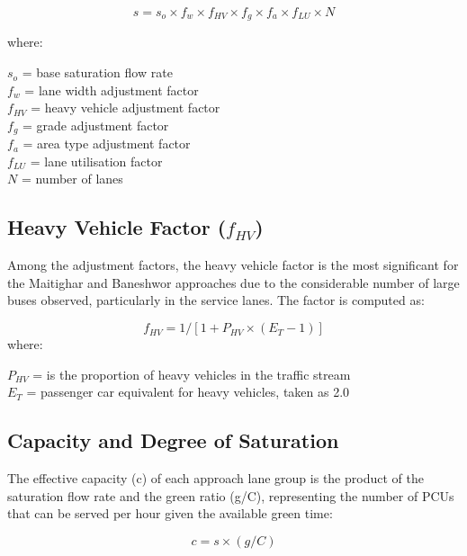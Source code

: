 \begin{equation}
    s = s_o \times f_w \times f_{HV} \times f_g \times f_a \times f_{LU} \times N
\end{equation}

where:

$s_o$ = base saturation flow rate \\
$f_w$ = lane width adjustment factor \\  
$f_{HV}$ = heavy vehicle adjustment factor \\
$f_g$ = grade adjustment factor \\
$f_a$ = area type adjustment factor \\ 
$f_{LU}$ = lane utilisation factor \\
$N$ = number of lanes


\subsection{Heavy Vehicle Factor ($f_{HV}$)}

    Among the adjustment factors, the heavy vehicle factor 
    is the most significant for the Maitighar and Baneshwor 
    approaches due to the considerable number of large buses 
    observed, particularly in the service lanes. The factor 
    is computed as:

    \begin{equation}
        f_{HV} = 1 / [1 + P_{HV} \times (E_T - 1)]
    \end{equation}
    where:

$P_{HV}$ = is the proportion of heavy vehicles in the traffic stream \\
$E_T$ = passenger car equivalent for heavy vehicles, taken as 2.0



\subsection{Capacity and Degree of Saturation}

The effective capacity (c) of each approach lane group is 
the product of the saturation flow rate and the green ratio 
(g/C), representing the number of PCUs that can be served 
per hour given the available green time:

\begin{equation}
    c = s \times (g / C)
\end{equation}

